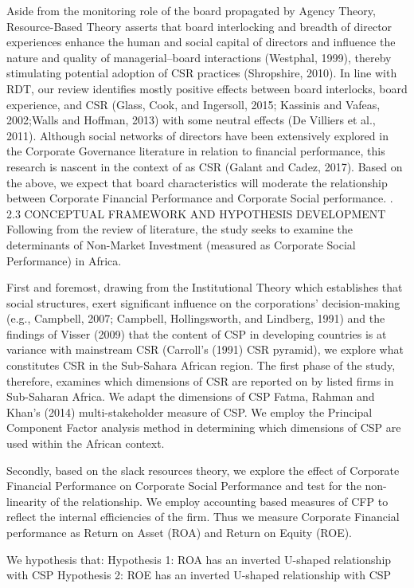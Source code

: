 \documentclass[
]{mitthesis}
\begin{document}
Aside from the monitoring role of the board propagated by Agency Theory, Resource-Based Theory asserts that board interlocking and breadth of director experiences enhance the human and social capital of directors and influence the nature and quality of managerial--board interactions (Westphal, 1999), thereby stimulating potential adoption of CSR practices (Shropshire, 2010). In line with RDT, our review identifies mostly positive effects between board interlocks, board experience, and CSR (Glass, Cook, and Ingersoll, 2015; Kassinis and Vafeas, 2002;Walls and Hoffman, 2013) with some neutral effects (De Villiers et al., 2011). Although social networks of directors have been extensively explored in the Corporate Governance literature in relation to financial performance, this research is nascent in the context of as CSR (Galant and Cadez, 2017). Based on the above, we expect that board characteristics will moderate the relationship between Corporate Financial Performance and Corporate Social performance.
.
2.3 CONCEPTUAL FRAMEWORK AND HYPOTHESIS DEVELOPMENT
Following from the review of literature, the study seeks to examine the determinants of Non-Market Investment (measured as Corporate Social Performance) in Africa.

First and foremost, drawing from the Institutional Theory which establishes that social structures, exert significant influence on the corporations' decision-making (e.g., Campbell, 2007; Campbell, Hollingsworth, and Lindberg, 1991) and the findings of Visser (2009) that the content of CSP in developing countries is at variance with mainstream CSR (Carroll's (1991) CSR pyramid), we explore what constitutes CSR in the Sub-Sahara African region. The first phase of the study, therefore, examines which dimensions of CSR are reported on by listed firms in Sub-Saharan Africa. We adapt the dimensions of CSP Fatma, Rahman and Khan's (2014) multi-stakeholder measure of CSP. We employ the Principal Component Factor analysis method in determining which dimensions of CSP are used within the African context.

Secondly, based on the slack resources theory, we explore the effect of Corporate Financial Performance on Corporate Social Performance and test for the non-linearity of the relationship. We employ accounting based measures of CFP to reflect the internal efficiencies of the firm. Thus we measure Corporate Financial performance as Return on Asset (ROA) and Return on Equity (ROE).

We hypothesis that:
Hypothesis 1: ROA has an inverted U-shaped relationship with CSP
Hypothesis 2: ROE has an inverted U-shaped relationship with CSP
\end{document}
